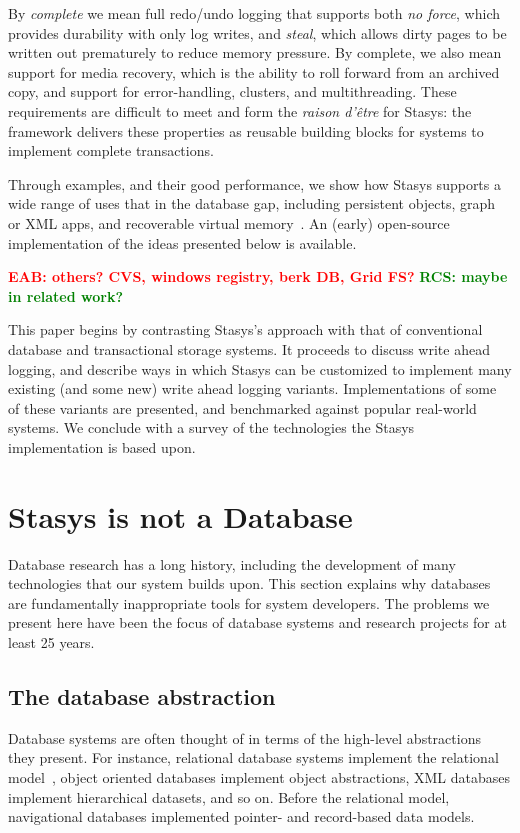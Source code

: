 \documentclass[letterpaper,twocolumn,10pt]{article}
\newcommand{\yad}{Stasys\xspace}
\newcommand{\eab}[1]{\textcolor{red}{\bf EAB: #1}}
\newcommand{\rcs}[1]{\textcolor{green}{\bf RCS: #1}}
\begin{document}
By {\em complete} we mean full redo/undo logging that supports
both {\em no force}, which provides durability with only log writes,
and {\em steal}, which allows dirty pages to be written out prematurely
to reduce memory pressure. By complete, we also
mean support for media recovery, which is the ability to roll
forward from an archived copy, and support for error-handling,
clusters, and multithreading. These requirements are difficult
to meet and form the {\em raison d'\^etre} for \yad{}: the framework
delivers these properties as reusable building blocks for systems
to implement complete transactions.

Through examples, and their good performance, we show how \yad{}
supports a wide range of uses that in the database gap, including
persistent objects, graph or XML apps, and recoverable
virtual memory~\cite{lrvm}.  An (early) open-source implementation of
the ideas presented below is available.

\eab{others?  CVS, windows registry, berk DB, Grid FS?}
\rcs{maybe in related work?}

This paper begins by contrasting \yad's approach with that of
conventional database and transactional storage systems.  It proceeds
to discuss write ahead logging, and describe ways in which \yad can be
customized to implement many existing (and some new) write ahead
logging variants.  Implementations of some of these variants are
presented, and benchmarked against popular real-world systems.  We
conclude with a survey of the technologies the \yad implementation is
based upon.

\section{\yad is not a Database}
\label{sec:notDB}
Database research has a long history, including the development of
many technologies that our system builds upon.  This section explains
why databases are fundamentally inappropriate tools for system
developers.  The problems we present here have been the focus of
database systems and research projects for at least 25 years.

\subsection{The database abstraction}

Database systems are often thought of in terms of the high-level
abstractions they present.  For instance, relational database systems
implement the relational model~\cite{codd}, object oriented
databases implement object abstractions, XML databases implement
hierarchical datasets, and so on.  Before the relational model,
navigational databases implemented pointer- and record-based data models.
\end{document}
